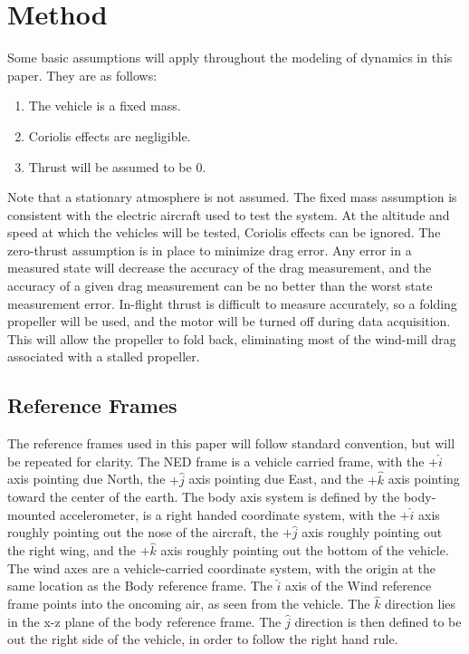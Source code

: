 \section{Method}
\label{background-information}
Some basic assumptions will apply throughout the modeling of dynamics in this paper. They are as follows:
\begin{enumerate}
\item The vehicle is a fixed mass.
\item Coriolis effects are negligible.
\item Thrust will be assumed to be 0.
\end{enumerate}
Note that a stationary atmosphere is not assumed. The fixed mass assumption is consistent with the electric aircraft used to test the system. At the altitude and speed at which the vehicles will be tested, Coriolis effects can be ignored\cite{klein2006aircraft}. The zero-thrust assumption is in place to minimize drag error. Any error in a measured state will decrease the accuracy of the drag measurement, and the accuracy of a given drag measurement can be no better than the worst state measurement error. In-flight thrust is difficult to measure accurately, so a folding propeller will be used, and the motor will be turned off during data acquisition. This will allow the propeller to fold back, eliminating most of the wind-mill drag associated with a stalled propeller. 

\subsection*{Reference Frames}
The reference frames used in this paper will follow standard convention\cite{klein2006aircraft}, but will be repeated for clarity. The NED frame is a vehicle carried frame, with the $+\hat{i}$ axis pointing due North, the $+\hat{j}$ axis pointing due East, and the $+\hat{k}$ axis pointing toward the center of the earth. The body axis system is defined by the body-mounted accelerometer, is a right handed coordinate system, with the $+\hat{i}$ axis roughly pointing out the nose of the aircraft, the $+\hat{j}$ axis roughly pointing out the right wing, and the $+\hat{k}$ axis roughly pointing out the bottom of the vehicle. The wind axes are a vehicle-carried coordinate system, with the origin at the same location as the Body reference frame. The $\hat{i}$ axis of the Wind reference frame points into the oncoming air, as seen from the vehicle. The $\hat{k}$ direction lies in the x-z plane of the body reference frame. The $\hat{j}$ direction is then defined to be out the right side of the vehicle, in order to follow the right hand rule. 

